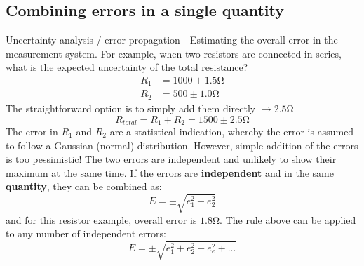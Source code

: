 \documentclass[class=report, crop=false, 12pt,a4paper]{standalone}
\begin{document}
\subsection{Combining errors in a single quantity}
Uncertainty analysis / error propagation - Estimating the overall error in the measurement system. For example, when two resistors are connected in series, what is the expected uncertainty of the total resistance?
\begin{align}
  R_1 &= 1000 \pm 1.5 \si{\ohm}\\
  R_2 &= 500 \pm 1.0 \si{\ohm}
\end{align}
The straightforward option is to simply add them directly $\rightarrow 2.5\si{\ohm}$
\begin{equation}
  R_{total} = R_1 + R_2 = 1500 \pm 2.5 \si{\ohm}
\end{equation}
The error in $R_1$ and $R_2$ are a statistical indication, whereby the error is assumed to follow a Gaussian (normal) distribution. However, simple addition of the errors is too pessimistic! The two errors are independent and unlikely to show their maximum at the same time. If the errors are \textbf{independent} and in the same \textbf{quantity}, they can be combined as: 
\begin{equation}
  E = \pm \sqrt{e_1^2 + e_2^2}
\end{equation}
and for this resistor example, overall error is $1.8 \si{\ohm}$. The rule above can be applied to any number of independent errors:
\begin{equation}
  E = \pm \sqrt{e_1^2 + e_2^2 + e_e^2 + ...}
\end{equation}
\end{document}

